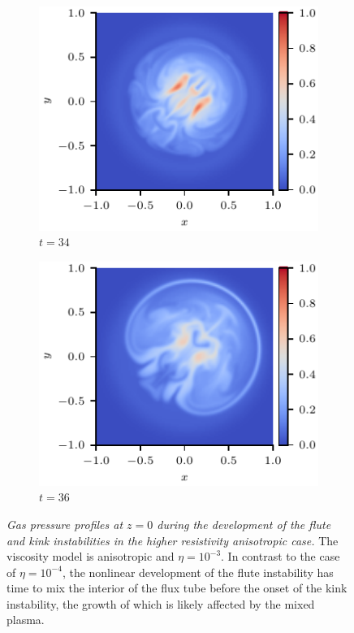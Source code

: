 \documentclass[fleqn,usenatbib]{mnras}
\newcommand{\rev}[1]{{\color{red} {#1}}}
\newcommand{\mycaption}[2]{\caption[#1]{\emph{#1} #2}}
\begin{document}
\begin{figure}
\begin{subfigure}{0.32\textwidth}
      \includegraphics[width=\linewidth]{swi-3_pressure_17.pdf}
      \caption{$t=34$}
      \label{fig:swi-3_pressure_17}
    \end{subfigure}
    \hfill
    \begin{subfigure}{0.32\textwidth}
      \includegraphics[width=\linewidth]{swi-3_pressure_18.pdf}
      \caption{$t=36$}
      \label{fig:swi-3_pressure_18}
    \end{subfigure}
\mycaption{\rev{Gas pressure} profiles at $z=0$ during the development of the flute and
kink instabilities in the higher resistivity anisotropic case.}{The viscosity
model is anisotropic and $\eta = 10^{-3}$. In contrast to the case of
$\eta=10^{-4}$, the nonlinear development of the flute instability has time to
mix the interior of the flux tube before the onset of the kink instability, the
growth of which is \rev{likely} affected by the mixed plasma.}
\label{fig:kink_pressure_slices-3}%
\end{figure}
\end{document}
